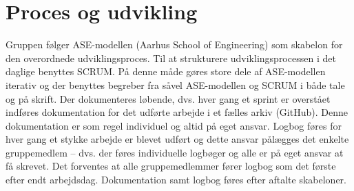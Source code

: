 \chapter{Proces og udvikling}
Gruppen følger ASE-modellen (Aarhus School of Engineering) som skabelon for den overordnede udviklingsproces. Til at strukturere udviklingsprocessen i det daglige benyttes SCRUM. På denne måde gøres store dele af ASE-modellen iterativ og der benyttes begreber fra såvel ASE-modellen og SCRUM i både tale og på skrift.
Der dokumenteres løbende, dvs. hver gang et sprint er overstået indføres dokumentation for det udførte arbejde i et fælles arkiv (GitHub). Denne dokumentation er som regel individuel og altid på eget ansvar. Logbog føres for hver gang et stykke arbejde er blevet udført og dette ansvar pålægges det enkelte gruppemedlem – dvs. der føres individuelle logbøger og alle er på eget ansvar at få skrevet. Det forventes at alle gruppemedlemmer fører logbog som det første efter endt arbejdsdag.
Dokumentation samt logbog føres efter aftalte skabeloner.